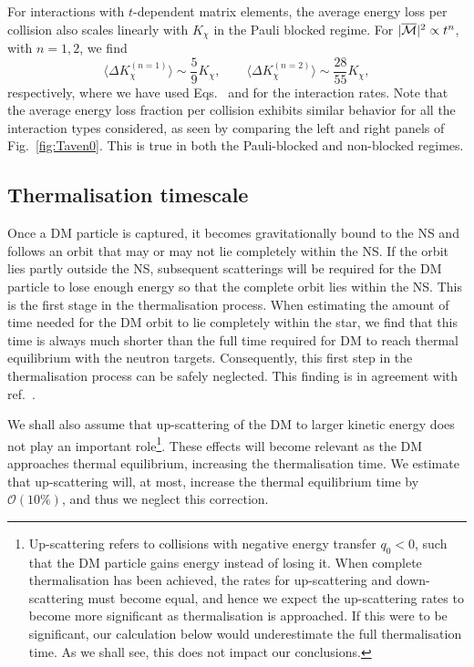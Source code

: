 For interactions with $t$-dependent matrix elements, the average energy loss per collision also scales linearly with $K_\chi$ in the Pauli blocked regime. For $|\overline{\mathcal M}|^2 \propto t^n$, with $n=1,2$, we find 
\begin{equation}
  \langle \Delta K_\chi^{(n=1)}\rangle \sim \frac{5}{9}K_\chi, \qquad 
  \langle \Delta K_\chi^{(n=2)} \rangle \sim \frac{28}{55}K_\chi ,
  \label{eq:aveElossn12}
\end{equation}
respectively, where we have used Eqs.~ and  for the interaction rates.
Note that the average energy loss fraction per collision exhibits similar behavior for all the interaction types considered,  
as seen by comparing the left and right panels of Fig.~\ref{fig:Taven0}. 
This is true in both the Pauli-blocked and non-blocked regimes.





\subsection{Thermalisation timescale}
\label{sec:thermstandard}




Once a DM particle is captured, it becomes gravitationally bound to the NS and follows an orbit that may or may not lie completely within the NS. If the orbit lies partly outside the NS, subsequent scatterings will be required for the DM particle to lose enough energy so that the complete orbit lies within the NS. This is the first stage in the thermalisation process. When estimating the amount of time needed for the DM orbit to lie completely within the star,  we find that this time is always much shorter than the full time required for DM to reach thermal equilibrium with the neutron targets. Consequently, this first step in the thermalisation process can be safely neglected. This finding is in agreement with ref.~\cite{Garani:2018kkd_may_NewAnalysisNeutron}. 

We shall also assume that up-scattering of the DM to larger kinetic energy does not play an important role\footnote{Up-scattering refers to collisions with negative energy transfer $q_0<0$, such that the DM particle gains energy instead of losing it. When complete thermalisation has been achieved, the rates for up-scattering and down-scattering must become equal, and hence we expect the up-scattering rates to become more significant as thermalisation is approached.
If this were to be significant, our calculation below would underestimate the full thermalisation time. As we shall see, this does not impact our conclusions.}. These effects will become relevant as the DM approaches thermal equilibrium, increasing the thermalisation time. We estimate that up-scattering will, at most, increase the thermal equilibrium time by $\mathcal{O}(10\%)$, and thus we neglect this correction. 


